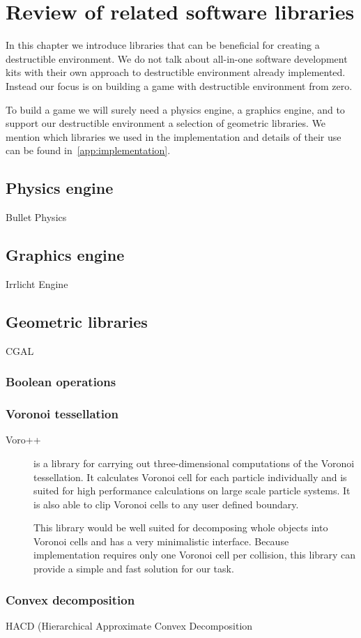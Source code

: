 \chapter{Review of related software libraries}
\label{chapt:technology}
In this chapter we introduce libraries that can be beneficial for creating a destructible environment. We do not talk about all-in-one software development kits with their own approach to destructible environment already implemented. Instead our focus is on building a game with destructible environment from zero. 

To build a game we will surely need a physics engine, a graphics engine, and to support our destructible environment a selection of geometric libraries. We mention which libraries we used in the implementation and details of their use can be found in~\cref{app:implementation}.

\section{Physics engine}
Bullet Physics


\section{Graphics engine}
Irrlicht Engine

\section{Geometric libraries}
CGAL

\subsection{Boolean operations}

\subsection{Voronoi tessellation}

\begin{description}
\item[Voro++] is a library for carrying out three-dimensional computations of the Voronoi tessellation. It calculates Voronoi cell for each particle individually and is suited for high performance calculations on large scale particle systems. It is also able to clip Voronoi cells to any user defined boundary.

This library would be well suited for decomposing whole objects into Voronoi cells and has a very minimalistic interface. Because implementation requires only one Voronoi cell per collision, this library can provide a simple and fast solution for our task.
\end{description}


\subsection{Convex decomposition}
\label{sec:decompositionLib}
HACD (Hierarchical Approximate Convex Decomposition
\cite{HACD}





